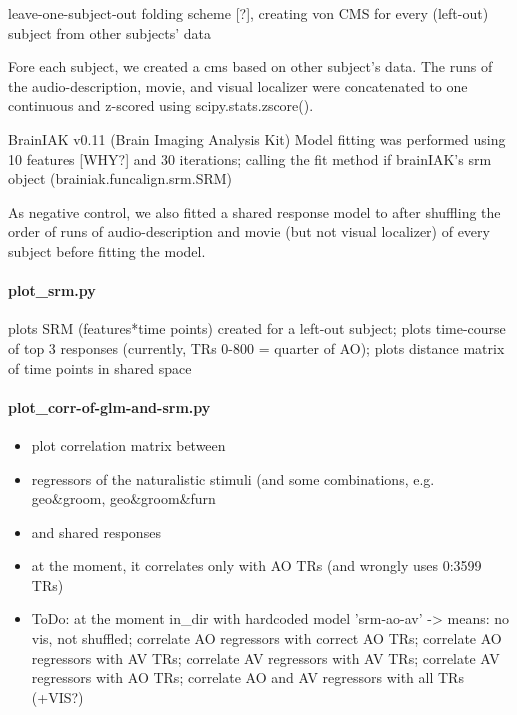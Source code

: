 {

leave-one-subject-out folding scheme [?], creating von CMS for every (left-out)
subject from other subjects' data

Fore each subject, we created a \ac{cms} based on other subject's data.
%
The runs of the audio-description, movie, and visual localizer were concatenated
to one continuous and z-scored using scipy.stats.zscore().


BrainIAK v0.11 (Brain Imaging Analysis Kit) \citep{kumar2020brainiak, kumar2020brainiaktutorial}
Model fitting was performed using 10 features [WHY?] and 30 iterations; calling
the fit method if brainIAK's srm object (brainiak.funcalign.srm.SRM)

As negative control, we also fitted a shared response model to after shuffling
the order of runs of audio-description and movie (but not visual localizer) of
every subject before fitting the model.


\paragraph{plot\_srm.py}

%
plots SRM (features*time points) created for a left-out subject; plots
time-course of top 3 responses (currently, TRs 0-800 = quarter of AO); plots
distance matrix of time points in shared space


\paragraph{plot\_corr-of-glm-and-srm.py}
%
\begin{itemize}
    \item plot correlation matrix between
    \item regressors of the naturalistic stimuli (and some combinations, e.g.
        geo\&groom, geo\&groom\&furn
    \item and shared responses
    \item at the moment, it correlates only with AO TRs (and wrongly uses
        0:3599 TRs)
    \item ToDo: at the moment in\_dir with hardcoded model 'srm-ao-av'
    ->  means: no vis, not shuffled; correlate AO regressors with correct AO
        TRs; correlate AO regressors with AV TRs; correlate AV regressors with
        AV TRs; correlate AV regressors with AO TRs; correlate AO and AV
        regressors with all TRs (+VIS?)
\end{itemize}


}
